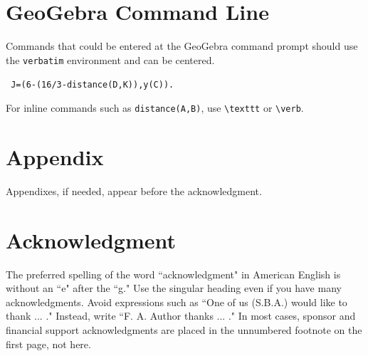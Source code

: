 %
%
\section{GeoGebra Command Line}
Commands that could be entered at the GeoGebra command prompt should use the \verb!verbatim! environment and can be centered.
\begin{center}
\verb! J=(6-(16/3-distance(D,K)),y(C)).!
\end{center}
For inline commands such as \texttt{distance(A,B)}, use \verb!\texttt! or \verb!\verb!.   





%
%
\section*{Appendix}
Appendixes, if needed, appear before the acknowledgment.





%
%
\section*{Acknowledgment}
The preferred spelling of the word ``acknowledgment" in American English is without an ``e" after the ``g." Use the singular heading even if you have many acknowledgments. Avoid expressions such as ``One of us (S.B.A.) would like to thank ... ." Instead, write ``F. A. Author thanks ... ." In most cases, sponsor and financial support acknowledgments are placed in the unnumbered footnote on the first page, not here.


